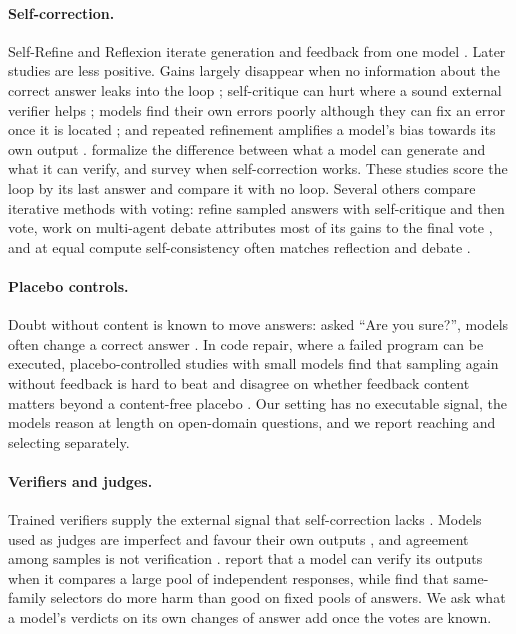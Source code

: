 \documentclass[11pt]{article}
\begin{document}
\paragraph{Self-correction.}
Self-Refine and Reflexion iterate generation and feedback from one model \citep{madaan2023selfrefine,shinn2023reflexion}.
Later studies are less positive.
Gains largely disappear when no information about the correct answer leaks into the loop \citep{huang2024cannot}; self-critique can hurt where a sound external verifier helps \citep{stechly2024selfverification}; models find their own errors poorly although they can fix an error once it is located \citep{tyen2024cannot}; and repeated refinement amplifies a model's bias towards its own output \citep{xu2024pride}.
\citet{song2024mindgap} formalize the difference between what a model can generate and what it can verify, and \citet{kamoi2024when} survey when self-correction works.
These studies score the loop by its last answer and compare it with no loop.
Several others compare iterative methods with voting: \citet{bilal2026refining} refine sampled answers with self-critique and then vote, work on multi-agent debate attributes most of its gains to the final vote \citep{smit2024mad,choi2025debate}, and at equal compute self-consistency often matches reflection and debate \citep{wang2024token}.

\paragraph{Placebo controls.}
Doubt without content is known to move answers: asked ``Are you sure?'', models often change a correct answer \citep{laban2024flipflop}.
In code repair, where a failed program can be executed, placebo-controlled studies with small models find that sampling again without feedback is hard to beat and disagree on whether feedback content matters beyond a content-free placebo \citep{iscan2026falsification,iscan2026form,verma2026blind}.
Our setting has no executable signal, the models reason at length on open-domain questions, and we report reaching and selecting separately.

\paragraph{Verifiers and judges.}
Trained verifiers supply the external signal that self-correction lacks \citep{lightman2024verify}.
Models used as judges are imperfect and favour their own outputs \citep{zheng2023judging,panickssery2024evaluators}, and agreement among samples is not verification \citep{denisov2026consensus}.
\citet{zhao2025sample} report that a model can verify its outputs when it compares a large pool of independent responses, while \citet{hu2026oracle} find that same-family selectors do more harm than good on fixed pools of answers.
We ask what a model's verdicts on its own changes of answer add once the votes are known.
\end{document}
